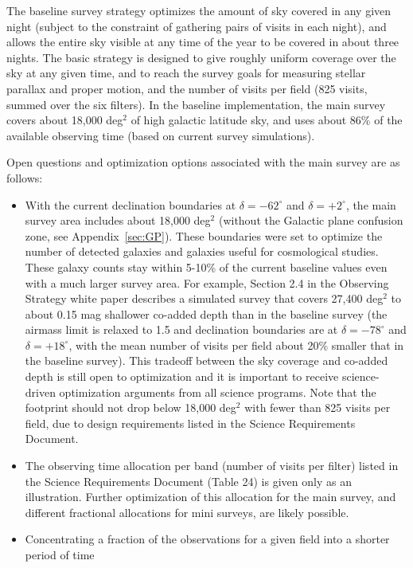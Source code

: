 \documentclass[DM,lsstdraft,toc,usenatbib]{lsstdoc}
\begin{document}
The baseline survey strategy optimizes the amount of sky covered in any given night (subject to 
the constraint of gathering pairs of visits in each night), 
and allows the entire sky visible at any time of the year to be covered in about three nights. 
The basic strategy is designed to give roughly uniform coverage over the sky at any given time, and to reach
the survey goals for measuring stellar parallax and proper motion, and the number of visits per 
field (825 visits, summed over the six filters). In the baseline implementation, the main survey 
covers about 18,000 deg$^2$ of high galactic latitude sky, and uses about 86\% of the available 
observing time (based on current survey simulations). 

Open questions and optimization options associated with the main survey are as follows: 
\begin{itemize}
\item With the current declination boundaries at $\delta = -62^\circ$ and $\delta = +2^\circ$,
the main survey area includes about 18,000 deg$^2$ (without the Galactic plane 
confusion zone, see Appendix~\ref{sec:GP}). These boundaries were set to optimize the number of
detected galaxies and galaxies useful for cosmological studies. These galaxy counts 
stay within 5-10\% of the current baseline values even with a much larger survey area. 
For example, Section 2.4 in the Observing Strategy white paper describes a simulated survey
that covers 27,400 deg$^2$ to about 0.15 mag shallower co-added depth than in the baseline 
survey (the airmass limit is relaxed to 1.5 and declination boundaries are at $\delta = -78^\circ$ 
and $\delta = +18^\circ$, with the mean number of visits per field about 20\% smaller that
in the baseline survey). This tradeoff between the sky coverage and co-added depth is still
open to optimization and it is important to receive science-driven optimization arguments
from all science programs.  Note that the footprint should not drop below 18,000 deg$^2$ with fewer
than 825 visits per field, due to design requirements listed in the Science Requirements Document. 
\item The observing time allocation per band (number of visits per filter) listed in the Science Requirements Document
(Table 24) is given only as an illustration. Further optimization of this allocation for the main 
survey, and different fractional allocations for mini surveys, are likely possible. 
\item Concentrating a fraction of the observations for a given field into a shorter period of time

\end{itemize}
\end{document}
